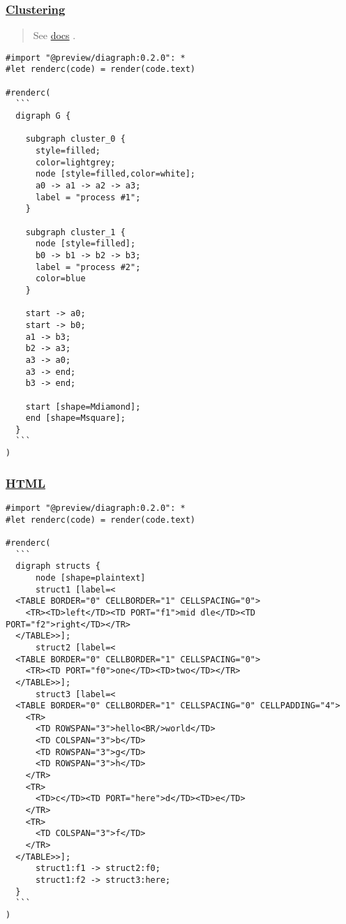 \subsubsection{\texorpdfstring{\hyperref[clustering]{Clustering}}{Clustering}}\label{clustering}

\begin{quote}
See \href{http://www.graphviz.org/content/cluster}{docs} .
\end{quote}

\begin{verbatim}
#import "@preview/diagraph:0.2.0": *
#let renderc(code) = render(code.text)

#renderc(
  ```
  digraph G {

    subgraph cluster_0 {
      style=filled;
      color=lightgrey;
      node [style=filled,color=white];
      a0 -> a1 -> a2 -> a3;
      label = "process #1";
    }

    subgraph cluster_1 {
      node [style=filled];
      b0 -> b1 -> b2 -> b3;
      label = "process #2";
      color=blue
    }

    start -> a0;
    start -> b0;
    a1 -> b3;
    b2 -> a3;
    a3 -> a0;
    a3 -> end;
    b3 -> end;

    start [shape=Mdiamond];
    end [shape=Msquare];
  }
  ```
)
\end{verbatim}

\pandocbounded{}

\subsubsection{\texorpdfstring{\hyperref[html]{HTML}}{HTML}}\label{html}

\begin{verbatim}
#import "@preview/diagraph:0.2.0": *
#let renderc(code) = render(code.text)

#renderc(
  ```
  digraph structs {
      node [shape=plaintext]
      struct1 [label=<
  <TABLE BORDER="0" CELLBORDER="1" CELLSPACING="0">
    <TR><TD>left</TD><TD PORT="f1">mid dle</TD><TD PORT="f2">right</TD></TR>
  </TABLE>>];
      struct2 [label=<
  <TABLE BORDER="0" CELLBORDER="1" CELLSPACING="0">
    <TR><TD PORT="f0">one</TD><TD>two</TD></TR>
  </TABLE>>];
      struct3 [label=<
  <TABLE BORDER="0" CELLBORDER="1" CELLSPACING="0" CELLPADDING="4">
    <TR>
      <TD ROWSPAN="3">hello<BR/>world</TD>
      <TD COLSPAN="3">b</TD>
      <TD ROWSPAN="3">g</TD>
      <TD ROWSPAN="3">h</TD>
    </TR>
    <TR>
      <TD>c</TD><TD PORT="here">d</TD><TD>e</TD>
    </TR>
    <TR>
      <TD COLSPAN="3">f</TD>
    </TR>
  </TABLE>>];
      struct1:f1 -> struct2:f0;
      struct1:f2 -> struct3:here;
  }
  ```
)
\end{verbatim}

